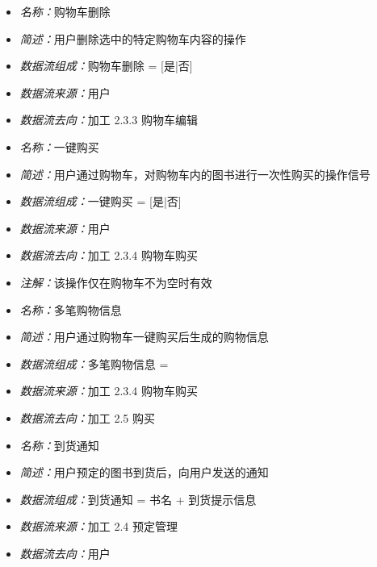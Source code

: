 \vspace{-1mm}

\begin{itemize}
	\item \textit{名称：}购物车删除
	\item \textit{简述：}用户删除选中的特定购物车内容的操作
	\item \textit{数据流组成：}购物车删除 = [是|否]
	\item \textit{数据流来源：}用户
	\item \textit{数据流去向：}加工 2.3.3 购物车编辑
\end{itemize}

\vspace{-1mm}

\begin{itemize}
	\item \textit{名称：}一键购买
	\item \textit{简述：}用户通过购物车，对购物车内的图书进行一次性购买的操作信号
	\item \textit{数据流组成：}一键购买 = [是|否]
	\item \textit{数据流来源：}用户
	\item \textit{数据流去向：}加工 2.3.4 购物车购买
	\item \textit{注解：}该操作仅在购物车不为空时有效
\end{itemize}

\vspace{-1mm}

\begin{itemize}
	\item \textit{名称：}多笔购物信息
	\item \textit{简述：}用户通过购物车一键购买后生成的购物信息
	\item \textit{数据流组成：}多笔购物信息 = 
	\item \textit{数据流来源：}加工 2.3.4 购物车购买
	\item \textit{数据流去向：}加工 2.5 购买
\end{itemize}

\vspace{-1mm}

\begin{itemize}
	\item \textit{名称：}到货通知
	\item \textit{简述：}用户预定的图书到货后，向用户发送的通知
	\item \textit{数据流组成：}到货通知 = 书名 + 到货提示信息
	\item \textit{数据流来源：}加工 2.4 预定管理
	\item \textit{数据流去向：}用户
\end{itemize}

